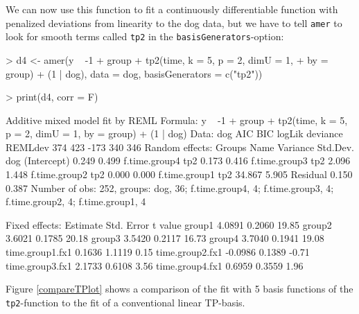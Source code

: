 \documentclass[12pt]{article}
\newenvironment{Schunk}{}{}
\newcommand{\code}[1]{\texttt{\small{#1}}}
\begin{document}
We can now use this function to fit a continuously differentiable function with
penalized deviations from linearity to the dog data, but we have to tell
\code{amer} to look for smooth terms called \code{tp2} in the
\code{basisGenerators}-option:
\begin{Schunk}
\begin{Sinput}
> d4 <- amer(y ~ -1 + group + tp2(time, k = 5, p = 2, dimU = 1, 
+     by = group) + (1 | dog), data = dog, basisGenerators = c("tp2"))
\end{Sinput}
\end{Schunk}
\begin{Schunk}
\begin{Sinput}
> print(d4, corr = F)
\end{Sinput}
\begin{Soutput}
Additive mixed model fit by REML 
Formula: y ~ -1 + group + tp2(time, k = 5, p = 2, dimU = 1, by = group) +      (1 | dog) 
   Data: dog 
 AIC BIC logLik deviance REMLdev
 374 423   -173      340     346
Random effects:
 Groups        Name        Variance Std.Dev.
 dog           (Intercept)  0.249   0.499   
 f.time.group4 tp2          0.173   0.416   
 f.time.group3 tp2          2.096   1.448   
 f.time.group2 tp2          0.000   0.000   
 f.time.group1 tp2         34.867   5.905   
 Residual                   0.150   0.387   
Number of obs: 252, groups: dog, 36; f.time.group4, 4; f.time.group3, 4; f.time.group2, 4; f.time.group1, 4

Fixed effects:
                Estimate Std. Error t value
group1            4.0891     0.2060   19.85
group2            3.6021     0.1785   20.18
group3            3.5420     0.2117   16.73
group4            3.7040     0.1941   19.08
time.group1.fx1   0.1636     1.1119    0.15
time.group2.fx1  -0.0986     0.1389   -0.71
time.group3.fx1   2.1733     0.6108    3.56
time.group4.fx1   0.6959     0.3559    1.96
\end{Soutput}
\end{Schunk}
Figure \ref{compareTPlot} shows a comparison of the fit with 5 basis functions of
the \code{tp2}-function to the fit of a conventional linear TP-basis.
\end{document}
